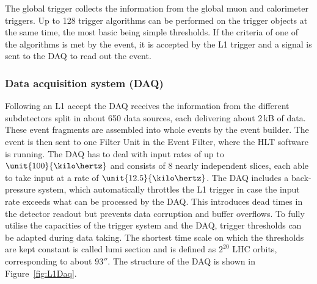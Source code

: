 The global trigger collects the information from the global muon and calorimeter triggers. Up to 128 trigger algorithms can be performed on the trigger objects at the same time, the most basic being simple \pt thresholds. If the criteria of one of the algorithms is met by the event, it is accepted by the L1 trigger and a signal is sent to the DAQ to read out the event.  


\subsubsection*{Data acquisition system (DAQ)}
Following an L1 accept the DAQ receives the information from the different subdetectors split in about 650 data sources, each delivering about 2\,kB of data. These event fragments are assembled into whole events by the event builder. The event is then sent to one Filter Unit in the Event Filter, where the HLT software is running. The DAQ has to deal with input rates of up to $\unit{100}{\kilo\hertz}$ and consists of 8 nearly independent slices, each able to take input at a rate of $\unit{12.5}{\kilo\hertz}$. The DAQ includes a back-pressure system, which automatically throttles the L1 trigger in case the input rate exceeds what can be processed by the DAQ. This introduces dead times in the detector readout but prevents data corruption and buffer overflows. To fully utilise the capacities of the trigger system and the DAQ, trigger thresholds can be adapted during data taking. The shortest time scale on which the thresholds are kept constant is called lumi section and is defined as $2^{20}$ LHC orbits, corresponding to about $\unit{93}{\second}$. The structure of the DAQ is shown in Figure~\ref{fig:L1Daq}.
